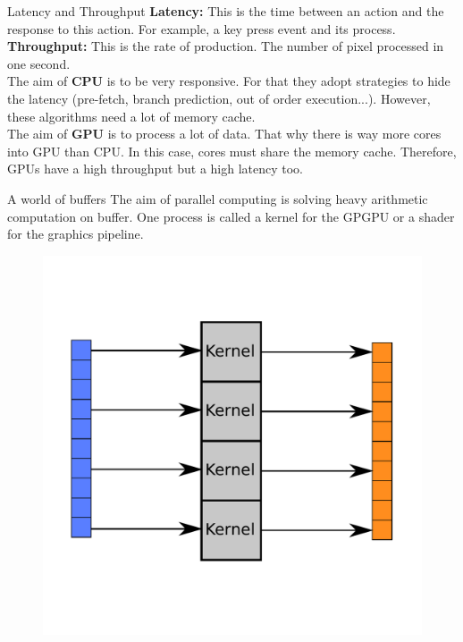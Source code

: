 \documentclass{beamer}
\begin{document}
\begin{frame}{Latency and Throughput}
	\textbf{Latency:} This is the time between an action and the response to this action. For example, a key press event and its process.\\
	\textbf{Throughput:} This is the rate of production. The number of pixel processed in one second.\\
	The aim of \textbf{CPU} is to be very responsive. For that they adopt strategies to hide the latency (pre-fetch, branch prediction, out of order execution...). However, these algorithms need a lot of memory cache.\\
	The aim of \textbf{GPU} is to process a lot of data. That why there is way more cores into GPU than CPU. In this case, cores must share the memory cache. Therefore, GPUs have a high throughput but a high latency too.
\end{frame}

\begin{frame}{A world of buffers}
	The aim of parallel computing is solving heavy arithmetic computation on buffer. One process is called a kernel for the GPGPU or a shader for the graphics pipeline.
	\begin{figure}
		\includegraphics[scale=0.3]{figures/buffer.pdf}
	\end{figure}
\end{frame}
\end{document}
